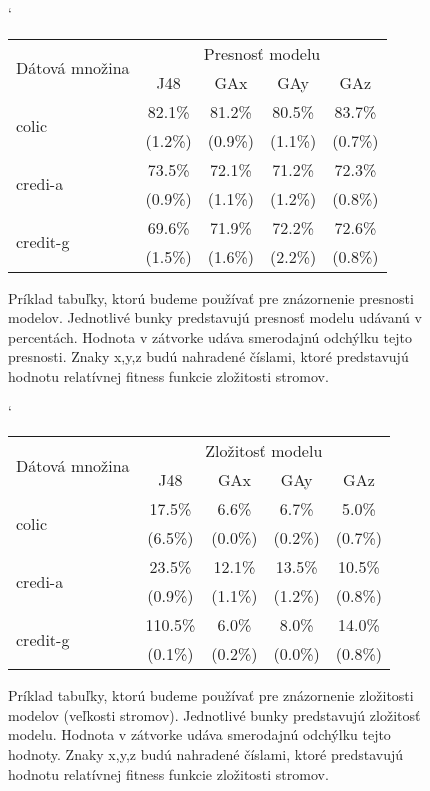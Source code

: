 \renewcommand{\figurename}{Tabuľka}
\begin{figure}[h]
\catcode`
\centering 
\newcommand\T{\rule{0pt}{2.6ex}}       %
\newcommand\B{\rule[-1.2ex]{0pt}{0pt}} %
\begin{tabular}{|l||c|c|c|c||}
\hline \multirow{2}{*}{Dátová množina} & \multicolumn{4}{|c||}{Presnosť modelu} \\ 
\cline{2-5} & J48 & GAx & GAy & GAz \\
\hline
\hline \multirow{2}{*}{colic} & 82.1\% & 81.2\% & 80.5\% & 83.7\% \T\\[-1.5ex]
& \tiny (1.2\%) & \tiny (0.9\%) & \tiny (1.1\%) & \tiny (0.7\%)\B\\
\hline \multirow{2}{*}{credi-a} & 73.5\% & 72.1\% & 71.2\% & 72.3\% \T\\[-1.5ex]
& \tiny (0.9\%) & \tiny (1.1\%) & \tiny (1.2\%) & \tiny (0.8\%)\B\\
\hline \multirow{2}{*}{credit-g} & 69.6\% & 71.9\% & 72.2\% & 72.6\% \T\\[-1.5ex]
& \tiny (1.5\%) & \tiny (1.6\%) & \tiny (2.2\%) & \tiny (0.8\%)\B\\
\hline
\end{tabular}
\caption{Príklad tabuľky, ktorú budeme používať pre znázornenie presnosti modelov. Jednotlivé bunky predstavujú presnosť modelu udávanú v percentách. Hodnota v zátvorke udáva smerodajnú odchýlku tejto presnosti. Znaky x,y,z budú nahradené číslami, ktoré predstavujú hodnotu relatívnej fitness funkcie zložitosti stromov.}\label{fig:tab1}
\end{figure}


\begin{figure}[h]
\catcode`
\centering 
\newcommand\T{\rule{0pt}{2.6ex}}       %
\newcommand\B{\rule[-1.2ex]{0pt}{0pt}} %
\begin{tabular}{|l||c|c|c|c||}
\hline \multirow{2}{*}{Dátová množina} & \multicolumn{4}{|c||}{Zložitosť modelu} \\ 
\cline{2-5} & J48 & GAx & GAy & GAz \\
\hline
\hline \multirow{2}{*}{colic} & 17.5\% & 6.6\% & 6.7\% & 5.0\% \T\\[-1.5ex]
& \tiny (6.5\%) & \tiny (0.0\%) & \tiny (0.2\%) & \tiny (0.7\%)\B\\
\hline \multirow{2}{*}{credi-a} & 23.5\% & 12.1\% & 13.5\% & 10.5\% \T\\[-1.5ex]
& \tiny (0.9\%) & \tiny (1.1\%) & \tiny (1.2\%) & \tiny (0.8\%)\B\\
\hline \multirow{2}{*}{credit-g} & 110.5\% & 6.0\% & 8.0\% & 14.0\% \T\\[-1.5ex]
& \tiny (0.1\%) & \tiny (0.2\%) & \tiny (0.0\%) & \tiny (0.8\%)\B\\
\hline
\end{tabular}
\caption{Príklad tabuľky, ktorú budeme používať pre znázornenie zložitosti modelov (veľkosti stromov). Jednotlivé bunky predstavujú zložitosť modelu. Hodnota v zátvorke udáva smerodajnú odchýlku tejto hodnoty. Znaky x,y,z budú nahradené číslami, ktoré predstavujú hodnotu relatívnej fitness funkcie zložitosti stromov.}\label{fig:tab2}
\end{figure}

